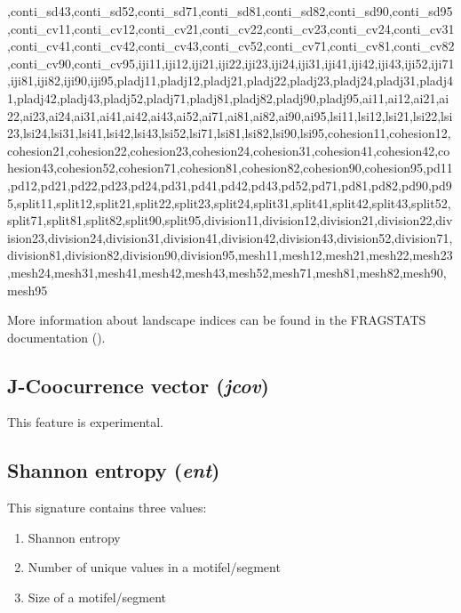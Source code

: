 ,conti_sd43,conti_sd52,conti_sd71,conti_sd81,conti_sd82,conti_sd90,conti_sd95,conti_cv11,conti_cv12,conti_cv21,conti_cv22,conti_cv23,conti_cv24,conti_cv31,conti_cv41,conti_cv42,conti_cv43,conti_cv52,conti_cv71,conti_cv81,conti_cv82,conti_cv90,conti_cv95,iji11,iji12,iji21,iji22,iji23,iji24,iji31,iji41,iji42,iji43,iji52,iji71,iji81,iji82,iji90,iji95,pladj11,pladj12,pladj21,pladj22,pladj23,pladj24,pladj31,pladj41,pladj42,pladj43,pladj52,pladj71,pladj81,pladj82,pladj90,pladj95,ai11,ai12,ai21,ai22,ai23,ai24,ai31,ai41,ai42,ai43,ai52,ai71,ai81,ai82,ai90,ai95,lsi11,lsi12,lsi21,lsi22,lsi23,lsi24,lsi31,lsi41,lsi42,lsi43,lsi52,lsi71,lsi81,lsi82,lsi90,lsi95,cohesion11,cohesion12,cohesion21,cohesion22,cohesion23,cohesion24,cohesion31,cohesion41,cohesion42,cohesion43,cohesion52,cohesion71,cohesion81,cohesion82,cohesion90,cohesion95,pd11,pd12,pd21,pd22,pd23,pd24,pd31,pd41,pd42,pd43,pd52,pd71,pd81,pd82,pd90,pd95,split11,split12,split21,split22,split23,split24,split31,split41,split42,split43,split52,split71,split81,split82,split90,split95,division11,division12,division21,division22,division23,division24,division31,division41,division42,division43,division52,division71,division81,division82,division90,division95,mesh11,mesh12,mesh21,mesh22,mesh23,mesh24,mesh31,mesh41,mesh42,mesh43,mesh52,mesh71,mesh81,mesh82,mesh90,mesh95



More information about landscape indices can be found in the FRAGSTATS documentation (\cite{mcgarigal2014fragstats}).

\subsection{J-Coocurrence vector ({\it jcov})}

This feature is experimental.

\subsection{Shannon entropy ({\it ent})}

This signature contains three values:

\begin{enumerate}
  \item Shannon entropy
  \item Number of unique values in a motifel/segment
  \item Size of a motifel/segment
\end{enumerate}
